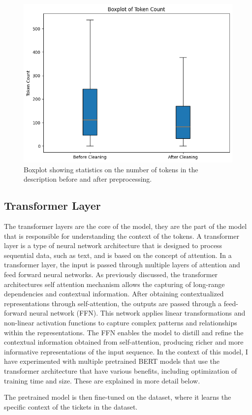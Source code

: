 \documentclass{UoYCSproject}
\begin{document}
    \begin{figure}[h]
        \includegraphics[width=\textwidth]{./figures/tokencount-prepost}
        \caption{Boxplot showing statistics on the number of tokens in the description before and after preprocessing.}
        \label{fig:token-boxplot}
    \end{figure}


    \subsection{Transformer Layer}\label{subsec:Transformer-Layer}
    The transformer layers are the core of the model, they are the part of the model that is responsible for understanding the context of the tokens.
    A transformer layer is a type of neural network architecture that is designed to process sequential data, such as text, and is based on the concept of attention.
    In a transformer layer, the input is passed through multiple layers of attention and feed forward neural networks.
    As previously discussed, the transformer architectures self attention mechanism allows the capturing of long-range dependencies and contextual information.
    After obtaining contextualized representations through self-attention, the outputs are passed through a feed-forward neural network (FFN).
    This network applies linear transformations and non-linear activation functions to capture complex patterns and relationships within the representations.
    The FFN enables the model to distill and refine the contextual information obtained from self-attention, producing richer and more informative representations of the input sequence.
    In the context of this model, I have experimented with multiple pretrained BERT models that use the transformer architecture that have various benefits, including optimization of training time and size.
These are explained in more detail below. \par
    The pretrained model is then fine-tuned on the dataset, where it learns the specific context of the tickets in the dataset.
\end{document}

